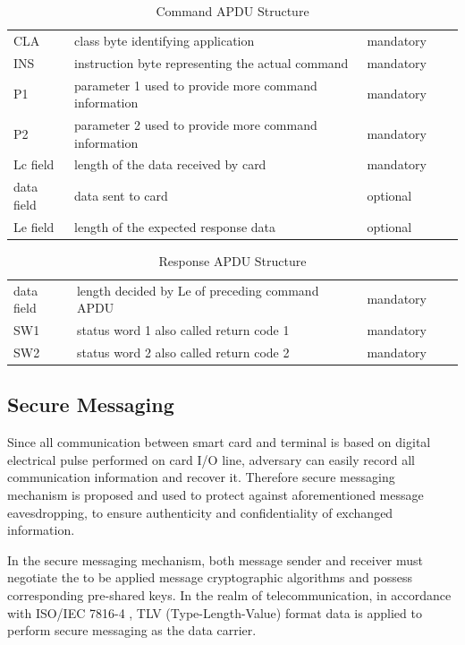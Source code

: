 \begin{table}[!htbp]
\caption{Command APDU Structure}
\centering
\begin{tabular}{lllll}
\hline\hline
 CLA &class byte identifying application  & mandatory \\[0.5ex]
 INS &instruction byte representing the actual command  & mandatory \\
 P1 &parameter 1 used to provide more command information & mandatory \\
 P2 &parameter 2 used to provide more command information& mandatory \\
 Lc field & length of the data received by card & mandatory \\
 data field &data sent to card& optional \\
Le field & length of the expected response data& optional \\
\hline
\end{tabular}
\label{table:capdu}
\end{table}

\begin{table}[ht]
\caption{Response APDU Structure}
\centering
\begin{tabular}{lllll}
\hline\hline
 data field & length decided by Le of preceding command  APDU  & mandatory \\[0.5ex]
 SW1 &status word 1 also called return code 1  & mandatory \\
 SW2 &status word 2 also called return code 2& mandatory \\
\hline
\end{tabular}
\label{table:rapdu}
\end{table}

\subsection{Secure Messaging} \label{secTLV}
Since all communication between smart card and terminal is based on digital electrical pulse performed on card I/O line, adversary can easily record all communication information and recover it. Therefore secure messaging mechanism is proposed and used to protect against aforementioned message eavesdropping, to ensure authenticity and confidentiality of exchanged information.

In the secure messaging mechanism, both message sender and receiver must negotiate the to be applied message cryptographic algorithms and possess corresponding pre-shared keys. In the realm of telecommunication, in accordance with ISO/IEC 7816-4 \cite{handbuch}, TLV (Type-Length-Value) format data is applied to perform secure messaging as the data carrier.

